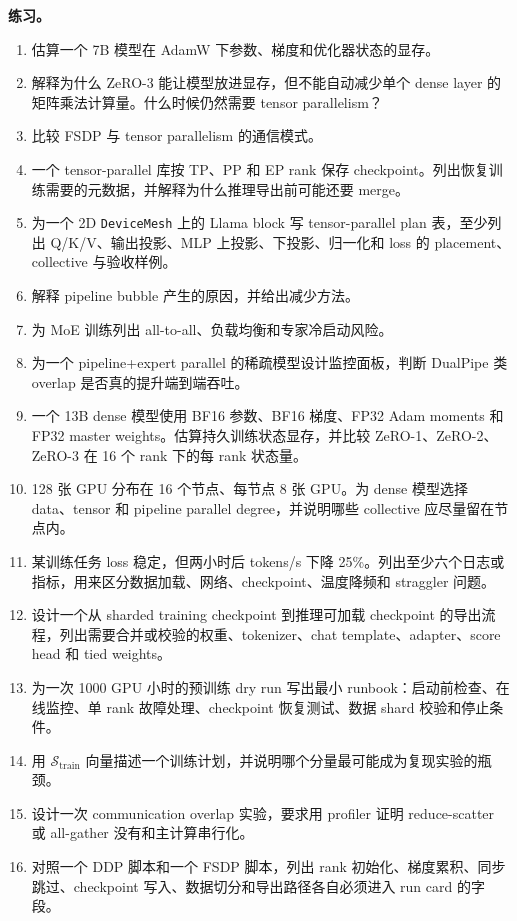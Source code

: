 \documentclass[UTF8,zihao=-4,openany]{ctexbook}
\begin{document}
\textbf{练习。}
\begin{enumerate}
\item 估算一个 7B 模型在 AdamW 下参数、梯度和优化器状态的显存。
\item 解释为什么 ZeRO-3 能让模型放进显存，但不能自动减少单个 dense layer 的矩阵乘法计算量。什么时候仍然需要 tensor parallelism？
\item 比较 FSDP 与 tensor parallelism 的通信模式。
\item 一个 tensor-parallel 库按 TP、PP 和 EP rank 保存 checkpoint。列出恢复训练需要的元数据，并解释为什么推理导出前可能还要 merge。
\item 为一个 2D \texttt{DeviceMesh} 上的 Llama block 写 tensor-parallel plan 表，至少列出 Q/K/V、输出投影、MLP 上投影、下投影、归一化和 loss 的 placement、collective 与验收样例。
\item 解释 pipeline bubble 产生的原因，并给出减少方法。
\item 为 MoE 训练列出 all-to-all、负载均衡和专家冷启动风险。
\item 为一个 pipeline+expert parallel 的稀疏模型设计监控面板，判断 DualPipe 类 overlap 是否真的提升端到端吞吐。
\item 一个 13B dense 模型使用 BF16 参数、BF16 梯度、FP32 Adam moments 和 FP32 master weights。估算持久训练状态显存，并比较 ZeRO-1、ZeRO-2、ZeRO-3 在 16 个 rank 下的每 rank 状态量。
\item 128 张 GPU 分布在 16 个节点、每节点 8 张 GPU。为 dense 模型选择 data、tensor 和 pipeline parallel degree，并说明哪些 collective 应尽量留在节点内。
\item 某训练任务 loss 稳定，但两小时后 tokens/s 下降 25\%。列出至少六个日志或指标，用来区分数据加载、网络、checkpoint、温度降频和 straggler 问题。
\item 设计一个从 sharded training checkpoint 到推理可加载 checkpoint 的导出流程，列出需要合并或校验的权重、tokenizer、chat template、adapter、score head 和 tied weights。
\item 为一次 1000 GPU 小时的预训练 dry run 写出最小 runbook：启动前检查、在线监控、单 rank 故障处理、checkpoint 恢复测试、数据 shard 校验和停止条件。
\item 用 $\mathcal{S}_{\mathrm{train}}$ 向量描述一个训练计划，并说明哪个分量最可能成为复现实验的瓶颈。
\item 设计一次 communication overlap 实验，要求用 profiler 证明 reduce-scatter 或 all-gather 没有和主计算串行化。
\item 对照一个 DDP 脚本和一个 FSDP 脚本，列出 rank 初始化、梯度累积、同步跳过、checkpoint 写入、数据切分和导出路径各自必须进入 run card 的字段。

\end{enumerate}
\end{document}
